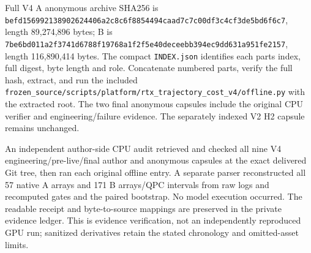 Full V4 A anonymous archive SHA256 is \nolinkurl{befd156992138902624406a2c8c6f8854494caad7c7c00df3c4cf3de5bd6f6c7}, length 89,274,896 bytes; B is \nolinkurl{7be6bd011a2f3741d6788f19768a1f2f5e40deceebb394ec9dd631a951fe2157}, length 116,890,414 bytes. The compact \texttt{INDEX.json} identifies each parts index, full digest, byte length and role. Concatenate numbered parts, verify the full hash, extract, and run the included \nolinkurl{frozen_source/scripts/platform/rtx_trajectory_cost_v4/offline.py} with the extracted root. The two final anonymous capsules include the original CPU verifier and engineering/failure evidence. The separately indexed V2 H2 capsule remains unchanged.

An independent author-side CPU audit retrieved and checked all nine V4 engineering/pre-live/final author and anonymous capsules at the exact delivered Git tree, then ran each original offline entry. A separate parser reconstructed all 57 native A arrays and 171 B arrays/QPC intervals from raw logs and recomputed gates and the paired bootstrap. No model execution occurred. The readable receipt and byte-to-source mappings are preserved in the private evidence ledger. This is evidence verification, not an independently reproduced GPU run; sanitized derivatives retain the stated chronology and omitted-asset limits.
